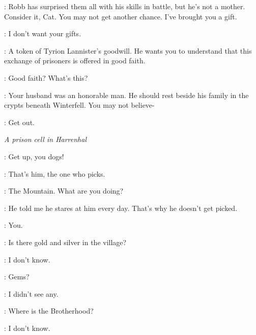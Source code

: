 \LITTLEFINGER: Robb has surprised them all with his skills in battle, but he's not a mother. Consider it, Cat. You may not get another chance. I've brought you a gift. 

\CATELYN: I don't want your gifts. 

\LITTLEFINGER: A token of Tyrion Lannister's goodwill. He wants you to understand that this exchange of prisoners is offered in good faith. 


\CATELYN: Good faith? What's this? 


\LITTLEFINGER: Your husband was an honorable man. He should rest beside his family in the crypts beneath Winterfell. You may not believe- 

\CATELYN: Get out. 



\scene

\textit{A prison cell in Harrenhal} 


\POLLIVER: Get up, you dogs! 


\HOTPIE: That's him, the one who picks. 


\ARYA: The Mountain. What are you doing? 


\HOTPIE: He told me he stares at him every day. That's why he doesn't get picked. 

\MOUNTAIN: You. 


\TICKLER: Is there gold and silver in the village? 

\PRISONER: I don't know. 

\TICKLER: Gems? 

\PRISONER: I didn't see any. 

\TICKLER: Where is the Brotherhood? 

\TICKLER: I don't know. 



